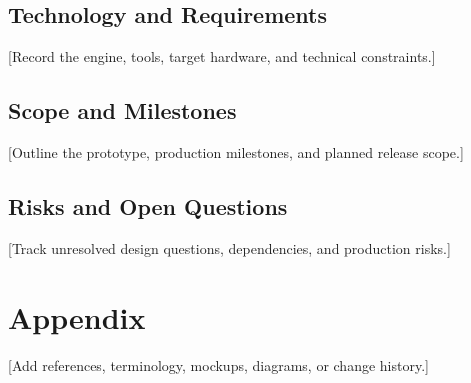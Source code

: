 \documentclass[11pt,a4paper]{article}
\begin{document}
\subsection{Technology and Requirements}
[Record the engine, tools, target hardware, and technical constraints.]

\subsection{Scope and Milestones}
[Outline the prototype, production milestones, and planned release scope.]

\subsection{Risks and Open Questions}
[Track unresolved design questions, dependencies, and production risks.]

\section{Appendix}
[Add references, terminology, mockups, diagrams, or change history.]
\end{document}
